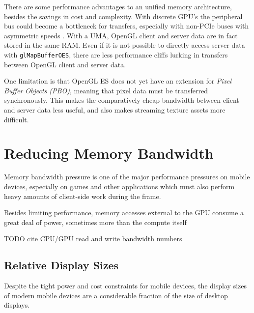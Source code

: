 
There are some performance advantages to an unified memory architecture, besides the savings in cost and complexity.  With discrete GPU's the peripheral bus could become a bottleneck for transfers, especially with non-PCIe buses with asymmetric speeds \cite{Elhasson05}.  With a UMA, OpenGL client and server data are in fact stored in the same RAM.  Even if it is not possible to directly access server data with \texttt{glMapBufferOES}, there are less performance cliffs lurking in transfers between OpenGL client and server data.


One limitation is that OpenGL ES does not yet have an extension for \textit{Pixel Buffer Objects (PBO)}, meaning that pixel data must be transferred synchronously.  This makes the comparatively cheap bandwidth between client and server data less useful, and also makes streaming texture assets more difficult.

\section{Reducing Memory Bandwidth}\label{Jon-McCaffrey:Reducing-Memory-Bandwidth}


Memory bandwidth pressure is one of the major performance pressures on mobile devices, especially on games and other applications which must also perform heavy amounts of client-side work during the frame.

Besides limiting performance, memory accesses external to the GPU consume a great deal of power, sometimes more than the compute itself \cite{Antochi04}

TODO cite CPU/GPU read and write bandwidth numbers

\subsection{Relative Display Sizes}\label{Jon-McCaffrey:relative-display-sizes}


Despite the tight power and cost constraints for mobile devices, the display sizes of modern mobile devices are a considerable fraction of the size of desktop displays.  

